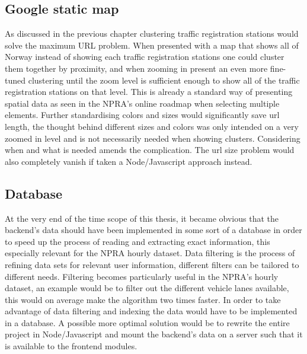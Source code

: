 \subsection{Google static map}
As discussed in the previous chapter clustering traffic registration stations would solve the maximum URL problem. When presented with a map that shows all of Norway instead of showing each traffic registration stations one could cluster them together by proximity, and when zooming in present an even more fine-tuned clustering until the zoom level is sufficient enough to show all of the traffic registration stations on that level. This is already a standard way of presenting spatial data as seen in the NPRA's online roadmap\cite{vegkart} when selecting multiple elements. Further standardising colors and sizes would significantly save url length, the thought behind different sizes and colors was only intended on a very zoomed in level and is not necessarily needed when showing clusters. Considering when and what is needed amends the complication. The url size problem would also completely vanish if taken a Node/Javascript approach instead. 

\subsection{Database}
At the very end of the time scope of this thesis, it became obvious that the backend's data should have been implemented in some sort of a database in order to speed up the process of reading and extracting exact information, this especially relevant for the NPRA hourly dataset. Data filtering is the process of refining data sets for relevant user information, different filters can be tailored to different needs. Filtering becomes particularly useful in the NPRA's hourly dataset, an example would be to filter out the different vehicle lanes available, this would on average make the algorithm two times faster. In order to take advantage of data filtering and indexing the data would have to be implemented in a database. A possible more optimal solution would be to rewrite the entire project in Node/Javascript and mount the backend's data on a server such that it is available to the frontend modules.

